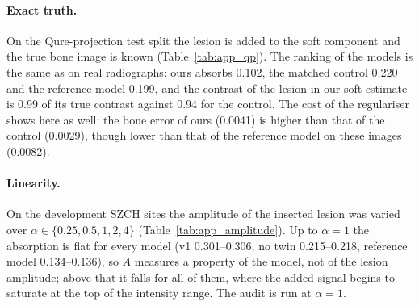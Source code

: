\paragraph{Exact truth.} On the Qure-projection test split the lesion is added to the soft component and the true bone image is known
(Table~\ref{tab:app_qp}). The ranking of the models is the same as on real radiographs: ours absorbs 0.102, the matched control 0.220 and the
reference model 0.199, and the contrast of the lesion in our soft estimate is 0.99 of its true contrast against 0.94 for the control. The cost
of the regulariser shows here as well: the bone error of ours (0.0041) is higher than that of the control (0.0029), though lower than that of
the reference model on these images (0.0082).

\paragraph{Linearity.} On the development SZCH sites the amplitude of the inserted lesion was varied over $\alpha\in\{0.25,0.5,1,2,4\}$
(Table~\ref{tab:app_amplitude}). Up to $\alpha=1$ the absorption is flat for every model (v1 0.301--0.306, no twin 0.215--0.218, reference
model 0.134--0.136), so $A$ measures a property of the model, not of the lesion amplitude; above that it falls for all of them, where the
added signal begins to saturate at the top of the intensity range. The audit is run at $\alpha=1$.

